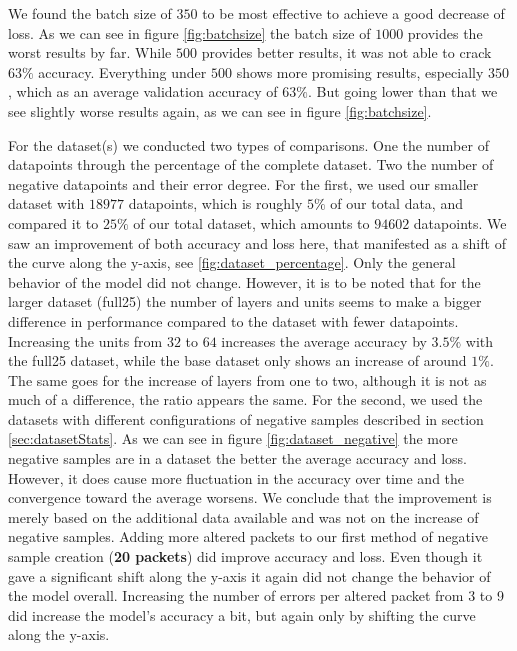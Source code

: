 \documentclass[
	ngerman,
	ruledheaders=section,%
	class=report,%
	thesis={type=bachelor},%
	accentcolor=9c,%
	custommargins=true,%
	marginpar=false,%
	parskip=half-,%
	fontsize=11pt,%
	twoside
]{tudapub}
\begin{document}
We found the batch size of $350$ to be most effective to achieve a good decrease of loss.
As we can see in figure \ref{fig:batchsize} the batch size of $1000$ provides the worst results by far.
While $500$ provides better results, it was not able to crack $63\%$ accuracy.
Everything under $500$ shows more promising results, especially $350$, which as an average validation accuracy of $63\%$.
But going lower than that we see slightly worse results again, as we can see in figure \ref{fig:batchsize}.

For the dataset(s) we conducted two types of comparisons.
One the number of datapoints through the percentage of the complete dataset.
Two the number of negative datapoints and their error degree.
For the first, we used our smaller dataset with $18977$ datapoints, which is roughly $5\%$ of our total data, and compared it to $25\%$ of our total dataset, which amounts to $94602$ datapoints.
We saw an improvement of both accuracy and loss here, that manifested as a shift of the curve along the y-axis, see \ref{fig:dataset_percentage}.
Only the general behavior of the model did not change.
However, it is to be noted that for the larger dataset (full25) the number of layers and units seems to make a bigger difference in performance compared to the dataset with fewer datapoints.
Increasing the units from $32$ to $64$ increases the average accuracy by $3.5\%$ with the full25 dataset, while the base dataset only shows an increase of around $1\%$.
The same goes for the increase of layers from one to two, although it is not as much of a difference, the ratio appears the same.
For the second, we used the datasets with different configurations of negative samples described in section \ref{sec:datasetStats}.
As we can see in figure \ref{fig:dataset_negative} the more negative samples are in a dataset the better the average accuracy and loss.
However, it does cause more fluctuation in the accuracy over time and the convergence toward the average worsens.
We conclude that the improvement is merely based on the additional data available and was not on the increase of negative samples.
Adding more altered packets to our first method of negative sample creation (\textbf{20 packets}) did improve accuracy and loss.
Even though it gave a significant shift along the y-axis it again did not change the behavior of the model overall.
Increasing the number of errors per altered packet from 3 to 9 did increase the model's accuracy a bit, but again only by shifting the curve along the y-axis.
\end{document}
